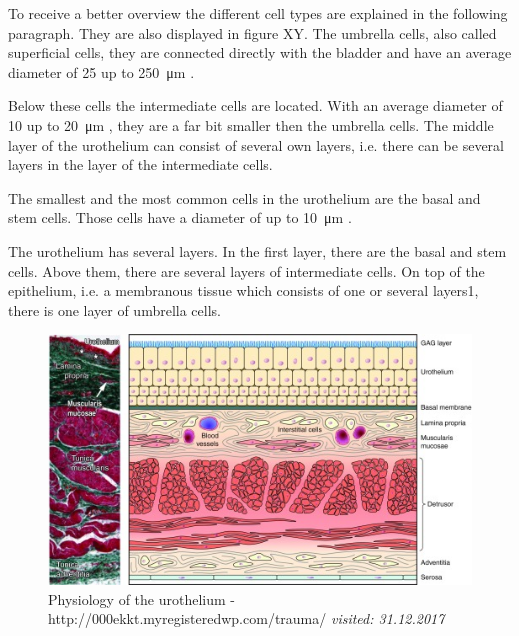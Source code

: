 To receive a better overview the different cell types are explained in the following paragraph. They are also displayed in figure XY.
The umbrella cells, also called superficial cells, they are connected directly with the bladder and have an average diameter of 25 up to \SI{250}{\micro\metre} \cite{Yamany2014, PuneetKhandelwal2009}. 

Below these cells the intermediate cells are located. With an average diameter of 10 up to \SI{20}{\micro\metre} \cite{Yamany2014, PuneetKhandelwal2009}, they are a far bit smaller then the umbrella cells. The middle layer of the urothelium can consist of several own layers, i.e. there can be several layers in the layer of the intermediate cells. 

The smallest and the most common cells in the urothelium are the basal and stem cells. Those cells have a diameter of up to \SI{10}{\micro\metre} \cite{Lazzeri2006, PuneetKhandelwal2009}. 

The urothelium has several layers. In the first layer, there are the basal and stem cells. Above them, there are several layers of intermediate cells. On top of the epithelium, i.e. a membranous tissue which consists of one or several layers1, there is one layer of umbrella cells.

\begin{figure}[t]
	\center
	\includegraphics{figures/pyhsiology-of-the-urothelium.png}
	\caption{Physiology of the urothelium - http://000ekkt.myregisteredwp.com/trauma/ \newline
			 \textit{visited: 31.12.2017}}
	\label{img:physiology_urothelium}
\end{figure}

